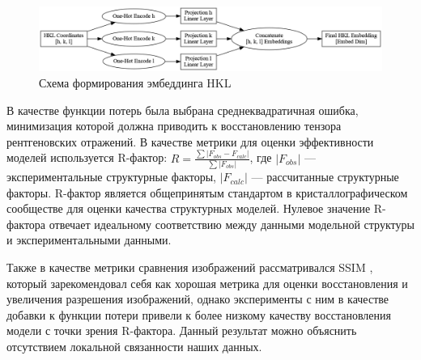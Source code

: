 \begin{figure}[H]
    \centering
    \includegraphics[width=1\textwidth]{figures/hkl_embedding_process.png}
    \caption{Схема формирования эмбеддинга HKL}
    \label{hklembed}
\end{figure}

В качестве функции потерь была выбрана среднеквадратичная ошибка, минимизация которой должна приводить к восстановлению тензора рентгеновских отражений. В качестве метрики для оценки эффективности моделей используется R-фактор: $R = \frac{\sum |F_{obs} - F_{calc}|}{\sum |F_{obs}|}$, где $|F_{obs}|$ --- экспериментальные структурные факторы, $|F_{calc}|$ --- рассчитанные структурные факторы. R-фактор является общепринятым стандартом в кристаллографическом сообществе для оценки качества структурных моделей. Нулевое значение R-фактора отвечает идеальному соответствию между данными модельной структуры и экспериментальными данными.

Также в качестве метрики сравнения изображений рассматривался SSIM \cite{zeng_3d-ssim_2012}, который зарекомендовал себя как хорошая метрика для оценки восстановления и увеличения разрешения изображений, однако эксперименты с ним в качестве добавки к функции потери привели к более низкому качеству восстановления модели с точки зрения R-фактора. Данный результат можно объяснить отсутствием локальной связанности наших данных.
